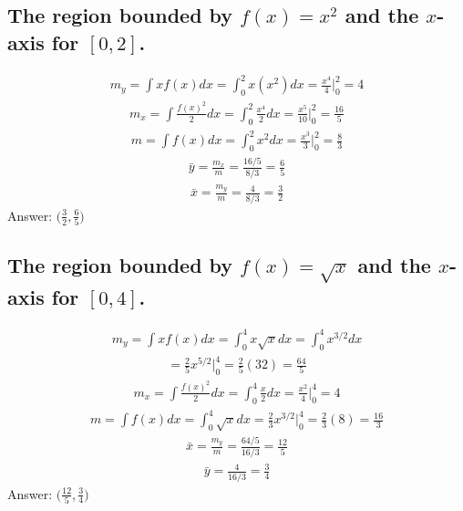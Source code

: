 \documentclass{article}
\begin{document}
\subsection{The region bounded by $f(x) = x^2$ and the $x$-axis for $[0, 2]$.}
\begin{align*}
	m_y = \int{x f(x)} dx = \int_0^2 {x(x^2)} dx = \frac{x^4}{4} \bigg|_0^2 = 4
\end{align*}
\begin{align*}
	m_x = \int{\frac{f(x)^2}{2}}dx = \int_0^2 {\frac{x^4}{2}} dx = \frac{x^5}{10} \bigg|_0^2 = \frac{16}{5}
\end{align*}
\begin{align*}
	m = \int{f(x)}dx = \int_0^2 {x^2}dx = \frac{x^3}{3} \bigg|_0^2 = \frac{8}{3}
\end{align*}
\begin{align*}
	\bar{y} = \frac{m_x}{m} = \frac{16/5}{8/3} = \frac{6}{5}
\end{align*}
\begin{align*}
	\bar{x} = \frac{m_y}{m} = \frac{4}{8/3} = \frac{3}{2}
\end{align*}
Answer: $\bigg(  \frac{3}{2}, \frac{6}{5} \bigg)$

\subsection{The region bounded by $f(x) = \sqrt{x}$ and the $x$-axis for $[0, 4]$.}
\begin{align*}
	m_y = \int{x f(x)}dx = \int_0^4 {x\sqrt{x}}dx = \int_0^4 {x^{3/2}}dx
\end{align*}
\begin{align*}
	= \frac{2}{5}x^{5/2} \bigg|_0^4 = \frac{2}{5}(32) = \frac{64}{5}
\end{align*}
\begin{align*}
	m_x = \int {\frac{f(x)^2}{2}}dx = \int_0^4 {\frac{x}{2}}dx = \frac{x^2}{4} \bigg|_0^4 = 4
\end{align*}
\begin{align*}
	m = \int {f(x)}dx = \int_0^4 {\sqrt{x}}dx = \frac{2}{3} x^{3/2} \bigg|_0^4 = \frac{2}{3} (8) = \frac{16}{3}
\end{align*}
\begin{align*}
	\bar{x} = \frac{m_y}{m} = \frac{64/5}{16/3} = \frac{12}{5}
\end{align*}
\begin{align*}
	\bar{y} = \frac{4}{16/3} = \frac{3}{4}
\end{align*}
Answer: $\bigg( \frac{12}{5}, \frac{3}{4} \bigg)$
\end{document}
